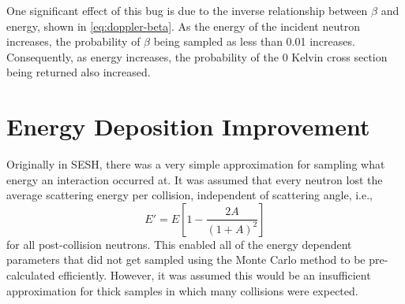     One significant effect of this bug is due to the inverse relationship between $\beta$ and energy, shown in \autoref{eq:doppler-beta}. As the energy of the incident neutron increases, the probability of $\beta$ being sampled as less than 0.01 increases. Consequently, as energy increases, the probability of the 0 Kelvin cross section being returned also increased.

\section{Energy Deposition Improvement}
    Originally in SESH, there was a very simple approximation for sampling what energy an interaction occurred at. It was assumed that every neutron lost the average scattering energy per collision, independent of scattering angle, i.e.,
    \begin{equation}
        E' = E \left[ 1 - \frac{2A}{\left( 1 + A \right)^2} \right]
    \end{equation}
    for all post-collision neutrons. This enabled all of the energy dependent parameters that did not get sampled using the Monte Carlo method to be pre-calculated efficiently. However, it was assumed this would be an insufficient approximation for thick samples in which many collisions were expected.
    
